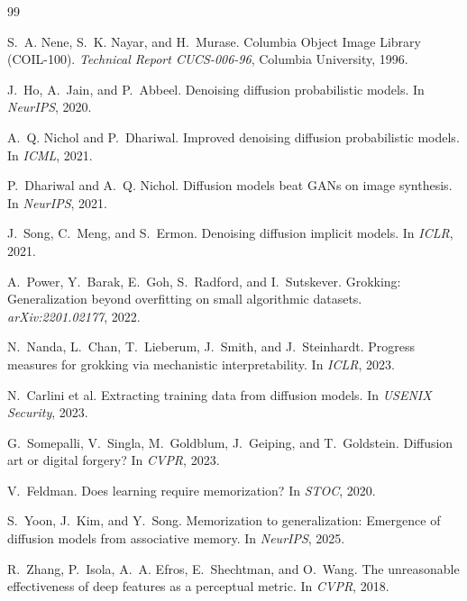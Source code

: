 \documentclass[11pt]{article}
\begin{document}

\begin{thebibliography}{99}

S.~A. Nene, S.~K. Nayar, and H.~Murase.
Columbia Object Image Library (COIL-100).
\textit{Technical Report CUCS-006-96}, Columbia University, 1996.

J.~Ho, A.~Jain, and P.~Abbeel.
Denoising diffusion probabilistic models.
In \textit{NeurIPS}, 2020.

A.~Q. Nichol and P.~Dhariwal.
Improved denoising diffusion probabilistic models.
In \textit{ICML}, 2021.

P.~Dhariwal and A.~Q. Nichol.
Diffusion models beat GANs on image synthesis.
In \textit{NeurIPS}, 2021.

J.~Song, C.~Meng, and S.~Ermon.
Denoising diffusion implicit models.
In \textit{ICLR}, 2021.

A.~Power, Y.~Barak, E.~Goh, S.~Radford, and I.~Sutskever.
Grokking: Generalization beyond overfitting on small algorithmic datasets.
\textit{arXiv:2201.02177}, 2022.

N.~Nanda, L.~Chan, T.~Lieberum, J.~Smith, and J.~Steinhardt.
Progress measures for grokking via mechanistic interpretability.
In \textit{ICLR}, 2023.

N.~Carlini et al.
Extracting training data from diffusion models.
In \textit{USENIX Security}, 2023.

G.~Somepalli, V.~Singla, M.~Goldblum, J.~Geiping, and T.~Goldstein.
Diffusion art or digital forgery?
In \textit{CVPR}, 2023.

V.~Feldman.
Does learning require memorization?
In \textit{STOC}, 2020.

S.~Yoon, J.~Kim, and Y.~Song.
Memorization to generalization: Emergence of diffusion models from associative memory.
In \textit{NeurIPS}, 2025.

R.~Zhang, P.~Isola, A.~A. Efros, E.~Shechtman, and O.~Wang.
The unreasonable effectiveness of deep features as a perceptual metric.
In \textit{CVPR}, 2018.

\end{thebibliography}
\end{document}
